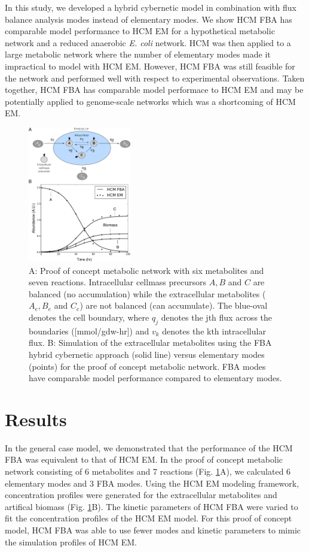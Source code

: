\documentclass[10pt,twocolumn,twoside,final]{IEEEtran}
\begin{document}
In this study, we developed a hybrid cybernetic model in combination with flux balance analysis modes instead of elementary modes. 
We show HCM FBA has comparable model performance to HCM EM for a hypothetical metabolic network and a reduced anaerobic \textit{E. coli} network. 
HCM was then applied to a large metabolic network where the number of elementary modes made it impractical to model with HCM EM.  
However, HCM FBA was still feasible for the network and performed well with respect to experimental observations. 
Taken together, HCM FBA has comparable model performace to HCM EM and may be potentially applied to genome-scale networks which was a shortcoming of HCM EM.


\begin{figure}[!t]\centering
\includegraphics[width=0.40\textwidth]{./figs/Fig-1-GeneralModel-Results.pdf}
\caption{A: Proof of concept metabolic network with six metabolites and seven reactions.
Intracellular cellmass precursors $A,B$ and $C$ are balanced (no accumulation) while the extracellular metabolites ($A_{e},B_{e}$ and $C_{e}$) are not balanced (can accumulate). The blue-oval denotes the cell boundary, where $q_{j}$ denotes the jth flux across the boundaries ([mmol/gdw-hr]) and $v_{k}$ denotes the kth intracellular flux. B: Simulation of the extracellular metabolites using the FBA hybrid cybernetic approach (solid line) versus elementary modes (points) for the proof of concept metabolic network. FBA modes have comparable model performance compared to elementary modes.
}\label{fig:model-fitting}
\end{figure}

\section{Results}
In the general case model, we demonstrated that the performance of the HCM FBA was equivalent to that of HCM EM.
In the proof of concept metabolic network consisting of 6 metabolites and 7 reactions (Fig. \ref{fig:model-fitting}A), we calculated 6 elementary modes and 3 FBA modes.  
Using the HCM EM modeling framework, concentration profiles were generated for the extracellular metabolites and artifical biomass (Fig. \ref {fig:model-fitting}B). 
The kinetic parameters of HCM FBA were varied to fit the concentration profiles of the HCM EM model. 
For this proof of concept model, HCM FBA was able to use fewer modes and kinetic parameters to mimic the simulation profiles of HCM EM.
\end{document}
